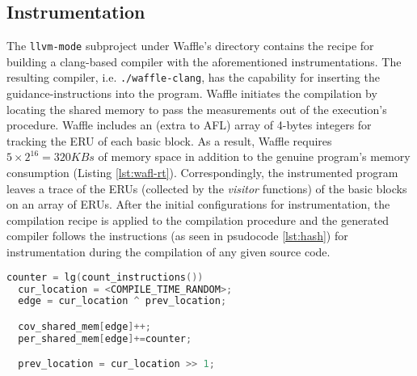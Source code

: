 \subsection{Instrumentation}
\label{subsec:inst}


The \texttt{llvm-mode} subproject under Waffle's directory contains the recipe for building a clang-based compiler with the aforementioned instrumentations. The resulting compiler, i.e. \texttt{./waffle-clang}, has the capability for inserting the guidance-instructions into the program. Waffle initiates the compilation by locating the shared memory to pass the measurements out of the execution's procedure. Waffle includes an (extra to AFL) array of 4-bytes integers for tracking the ERU of each basic block. As a result, Waffle requires $5\times2^{16}=320KBs$ of memory space in addition to the genuine program's memory consumption (Listing \ref{lst:wafl-rt}). Correspondingly, the instrumented program leaves a trace of the ERUs (collected by the \textit{visitor} functions) of the basic blocks on an array of ERUs. After the initial configurations for instrumentation, the compilation recipe is applied to the compilation procedure and the generated compiler follows the instructions (as seen in psudocode \ref{lst:hash}) for instrumentation during the compilation of any given source code.

\begin{minipage}{\textwidth}
\begin{lstlisting}[language=C++,style=CodeStyle,label={lst:hash},caption={Select element and update in shared\_mem}]
  counter = lg(count_instructions())
  cur_location = <COMPILE_TIME_RANDOM>;
  edge = cur_location ^ prev_location;

  cov_shared_mem[edge]++;
  per_shared_mem[edge]+=counter;

  prev_location = cur_location >> 1;
\end{lstlisting}
\end{minipage}
  

  


